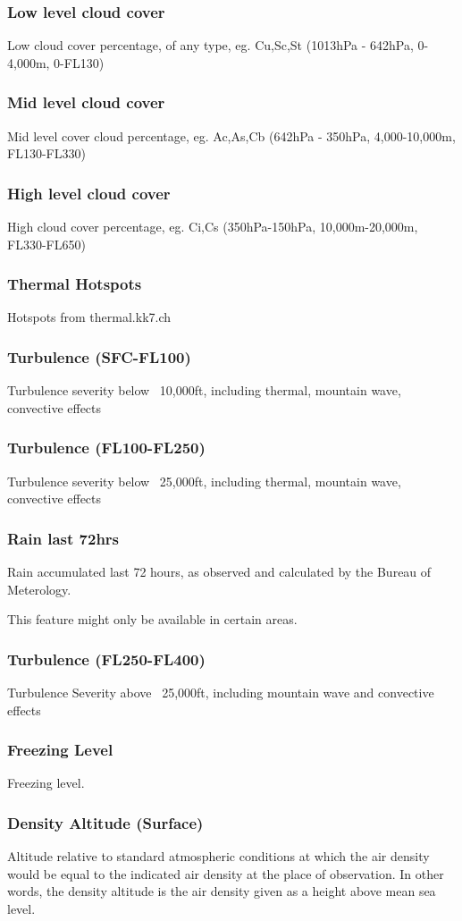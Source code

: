 \documentclass[11pt,a4paper]{article}
\begin{document}
\subsubsection{Low level cloud cover}
Low cloud cover percentage, of any type, eg. Cu,Sc,St (1013hPa - 642hPa, 0-4,000m, 0-FL130)
\subsubsection{Mid level cloud cover}
Mid level cover cloud percentage, eg. Ac,As,Cb (642hPa - 350hPa, 4,000-10,000m, FL130-FL330)
\subsubsection{High level cloud cover}
High cloud cover percentage, eg. Ci,Cs (350hPa-150hPa, 10,000m-20,000m, FL330-FL650)
\subsubsection{Thermal Hotspots}
Hotspots from thermal.kk7.ch
\subsubsection{Turbulence (SFC-FL100)}
Turbulence severity below ~10,000ft, including thermal, mountain wave, convective effects
\subsubsection{Turbulence (FL100-FL250)}
Turbulence severity below ~25,000ft, including thermal, mountain wave, convective effects
\subsubsection{Rain last 72hrs}
Rain accumulated last 72 hours, as observed and calculated by the Bureau of Meterology.
\begin{tip}
\item This feature might only be available in certain areas.\\
\end{tip}
\subsubsection{Turbulence (FL250-FL400)}
Turbulence Severity above ~25,000ft, including mountain wave and convective effects
\subsubsection{Freezing Level}
Freezing level.
\subsubsection{Density Altitude (Surface)}
Altitude relative to standard atmospheric conditions at which the air density would be equal to the indicated air density at the place of observation. In other words, the density altitude is the air density given as a height above mean sea level.
\end{document}
